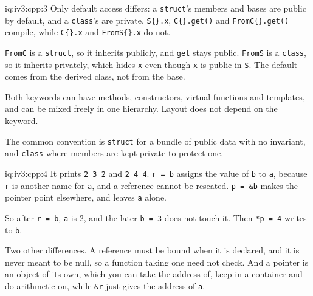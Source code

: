 \begin{solution}{iq:iv3:cpp:3}
Only default access differs: a \texttt{struct}'s members and bases are public by default, and a \texttt{class}'s are private. \texttt{S\{\}.x}, \texttt{C\{\}.get()} and \texttt{FromC\{\}.get()} compile, while \texttt{C\{\}.x} and \texttt{FromS\{\}.x} do not.

\texttt{FromC} is a \texttt{struct}, so it inherits publicly, and \texttt{get} stays public. \texttt{FromS} is a \texttt{class}, so it inherits privately, which hides \texttt{x} even though \texttt{x} is public in \texttt{S}. The default comes from the derived class, not from the base.

Both keywords can have methods, constructors, virtual functions and templates, and can be mixed freely in one hierarchy. Layout does not depend on the keyword.

The common convention is \texttt{struct} for a bundle of public data with no invariant, and \texttt{class} where members are kept private to protect one.

\end{solution}

\begin{solution}{iq:iv3:cpp:4}
It prints \texttt{2 3 2} and \texttt{2 4 4}. \texttt{r = b} assigns the value of \texttt{b} to \texttt{a}, because \texttt{r} is another name for \texttt{a}, and a reference cannot be reseated. \texttt{p = \&b} makes the pointer point elsewhere, and leaves \texttt{a} alone.

So after \texttt{r = b}, \texttt{a} is 2, and the later \texttt{b = 3} does not touch it. Then \texttt{*p = 4} writes to \texttt{b}.

Two other differences. A reference must be bound when it is declared, and it is never meant to be null, so a function taking one need not check. And a pointer is an object of its own, which you can take the address of, keep in a container and do arithmetic on, while \texttt{\&r} just gives the address of \texttt{a}.

\end{solution}

